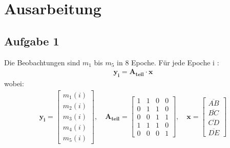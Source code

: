\chapter{Ausarbeitung}
\section{Aufgabe 1}
Die Beobachtungen sind $m_1$ bis $m_5$ in 8 Epoche. Für jede Epoche i : 
\begin{gather}
	\bm{y_i} = \bm{A_{teil}} \cdot \bm{x} 
\end{gather}
wobei:
\begin{gather}
\bm{y_i} = \begin{bmatrix}
m_1(i) \\
m_2(i) \\
m_3(i) \\
m_4(i) \\
m_5(i)
\end{bmatrix}, \quad 
\bm{A_{teil}} =  \begin{bmatrix}
1 & 1 & 0 & 0\\
0 & 1 & 1 & 0\\
0 & 0 & 1 & 1\\
1 & 1 & 1 & 0\\
0 & 0 & 0 & 1 
\end{bmatrix}, \quad \bm{x} = \begin{bmatrix}
\overline{AB} \\
\overline{BC} \\
\overline{CD} \\
\overline{DE} 
\end{bmatrix}
\end{gather}
